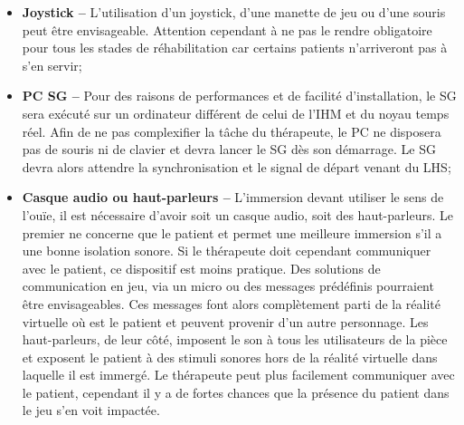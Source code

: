 \begin{itemize}
				\item \textbf{Joystick --} L'utilisation d'un joystick, d'une manette de jeu ou d'une souris peut être envisageable. Attention cependant à ne pas le rendre obligatoire pour tous les stades de réhabilitation car certains patients n'arriveront pas à s'en servir;
				
				\item \textbf{PC SG --} Pour des raisons de performances et de facilité d'installation, le SG sera exécuté sur un ordinateur différent de celui de l'IHM et du noyau temps réel. Afin de ne pas complexifier la tâche du thérapeute, le PC ne disposera pas de souris ni de clavier et devra lancer le SG dès son démarrage. Le SG devra alors attendre la synchronisation et le signal de départ venant du LHS;
				
				\item \textbf{Casque audio ou haut-parleurs --} L'immersion devant utiliser le sens de l'ouïe, il est nécessaire d'avoir soit un casque audio, soit des haut-parleurs. Le premier ne concerne que le patient et permet une meilleure immersion s'il a une bonne isolation sonore. Si le thérapeute doit cependant communiquer avec le patient, ce dispositif est moins pratique. Des solutions de communication en jeu, via un micro ou des messages prédéfinis pourraient être envisageables. Ces messages font alors complètement parti de la réalité virtuelle où est le patient et peuvent provenir d'un autre personnage. Les haut-parleurs, de leur côté, imposent le son à tous les utilisateurs de la pièce et exposent le patient à des stimuli sonores hors de la réalité virtuelle dans laquelle il est immergé. Le thérapeute peut plus facilement communiquer avec le patient, cependant il y a de fortes chances que la présence du patient dans le jeu s'en voit impactée. \medskip
				
				\begin{minipage}{\linewidth}
					\label{Peripheriques}
				\end{minipage}\medskip	
			\end{itemize}
